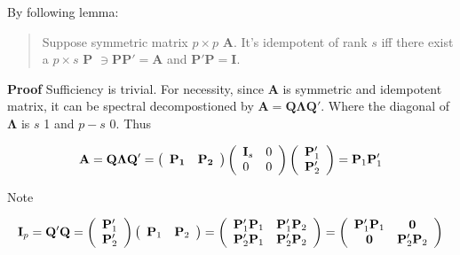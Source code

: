 \documentclass{article}
\begin{document}
By following lemma:

\begin{quote}
Suppose symmetric matrix \(p\times p\) \(\mathbf{A}\). It's idempotent
of rank \(s\) iff there exist a \(p\times s\) \(\mathbf{P}\)
\(\ni \mathbf{PP'=A}\) and \(\mathbf{P'P=I}\).
\end{quote}

\textbf{Proof} Sufficiency is trivial. For necessity, since
\(\mathbf{A}\) is symmetric and idempotent matrix, it can be spectral
decompostioned by \(\mathbf{A=Q\Lambda Q'}\). Where the diagonal of
\(\mathbf{\Lambda}\) is \(s\) 1 and \(p-s\) 0. Thus

\[ \mathbf{A=Q\Lambda Q'}= \left( \begin{array} { l l } \mathbf{P_1} & \mathbf{P_2} \end{array} \right) \left( \begin{array} { l l } \mathbf { I } _ { s } & 0 \\ 0 & 0 \end{array} \right) \left( \begin{array} { l } \mathbf { P } _ { 1 } ^ { \prime } \\ \mathbf { P } _ { 2 } ^ { \prime } \end{array} \right) = \mathbf { P } _ { 1 } \mathbf { P } _ { 1 } ^ { \prime } \]

Note

\[ \mathbf { I } _ { p } = \mathbf { Q } ^ { \prime } \mathbf { Q } = \left( \begin{array} { c } \mathbf { P } _ { 1 } ^ { \prime } \\ \mathbf { P } _ { 2 } ^ { \prime } \end{array} \right) \left( \begin{array} { c c } \mathbf { P } _ { 1 } & \mathbf { P } _ { 2 } \end{array} \right) = \left( \begin{array} { c c } \mathbf { P } _ { 1 } ^ { \prime } \mathbf { P } _ { 1 } & \mathbf { P } _ { 1 } ^ { \prime } \mathbf { P } _ { 2 } \\ \mathbf { P } _ { 2 } ^ { \prime } \mathbf { P } _ { 1 } & \mathbf { P } _ { 2 } ^ { \prime } \mathbf { P } _ { 2 } \end{array} \right)= \left( \begin{array} { c c } \mathbf { P } _ { 1 } ^ { \prime } \mathbf { P } _ { 1 } & \mathbf{0}\\ \mathbf{0} & \mathbf { P } _ { 2 } ^ { \prime } \mathbf { P } _ { 2 } \end{array} \right)\]
\end{document}

